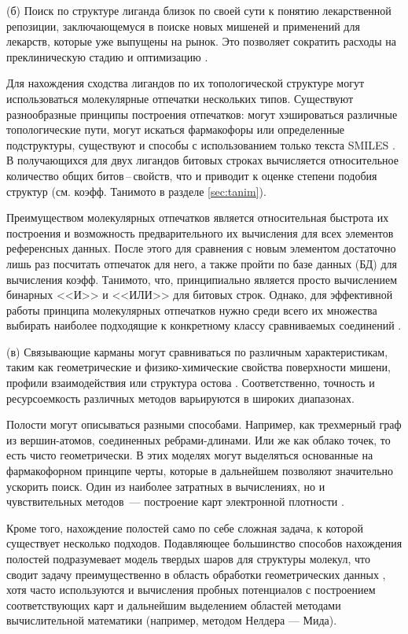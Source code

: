 \documentclass[a4paper,14pt]{article}         %
\begin{document}
(б) Поиск по структуре лиганда близок по своей сути к понятию лекарственной репозиции, заключающемуся в поиске новых мишеней и применений для лекарств, которые уже выпущены на рынок. Это позволяет сократить расходы на преклиническую стадию и оптимизацию \cite{Hall2015, March-Vila2017}.

Для нахождения сходства лигандов по их топологической структуре могут использоваться молекулярные отпечатки нескольких типов. Существуют разнообразные принципы построения отпечатков: могут хэшироваться различные топологические пути, могут искаться фармакофоры или определенные подструктуры, существуют и способы с использованием только текста SMILES \cite{Cereto-Massague2015}. В получающихся для двух лигандов битовых строках вычисляется относительное количество общих битов\,--\,свойств, что и приводит к оценке степени подобия структур (см. коэфф. Танимото в разделе \ref{sec:tanim}). 

Преимуществом молекулярных отпечатков является относительная быстрота их построения и возможность предварительного их вычисления для всех элементов референсных данных. После этого для сравнения с новым элементом достаточно лишь раз посчитать отпечаток для него, а также пройти по базе данных (БД) для вычисления коэфф. Танимото, что, принципиально является просто вычислением бинарных <<И>> и <<ИЛИ>> для битовых строк. Однако, для эффективной работы принципа молекулярных отпечатков нужно среди всего их множества выбирать наиболее подходящие к конкретному классу сравниваемых соединений \cite{Cereto-Massague2015}.

(в) Связывающие карманы могут сравниваться по различным характеристикам, таким как геометрические и физико-химические свойства поверхности мишени, профили взаимодействия или структура остова \cite{Ehrt2016}. Соответственно, точность и ресурсоемкость различных методов варьируются в широких диапазонах.

Полости могут описываться разными способами. Например, как трехмерный граф из вершин-атомов, соединенных ребрами-длинами. Или же как облако точек, то есть чисто геометрически. В этих моделях могут выделяться основанные на фармакофорном принципе черты, которые в дальнейшем позволяют значительно ускорить поиск. Один из наиболее затратных в вычислениях, но и чувствительных методов~--- построение карт электронной плотности \cite{Ehrt2016}.

Кроме того, нахождение полостей само по себе сложная задача, к которой существует несколько подходов. Подавляющее большинство способов нахождения полостей подразумевает модель твердых шаров для структуры молекул, что сводит задачу преимущественно в область обработки геометрических данных \cite {Krone2016}, хотя часто используются и вычисления пробных потенциалов с построением соответствующих карт и дальнейшим выделением областей методами вычислительной математики (например, методом Нелдера — Мида).
\end{document}
